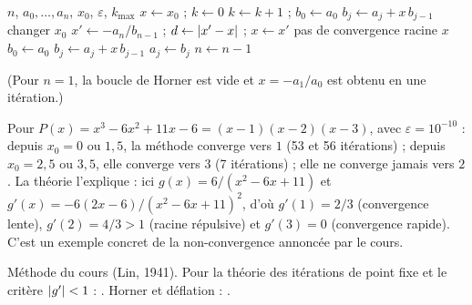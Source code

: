 \begin{algo}
  \Require $n$, $a_0, \dots, a_n$, $x_0$, $\varepsilon$, $k_{\max}$
    \State $x \leftarrow x_0$ ; $k \leftarrow 0$
    \Repeat
      \State $k \leftarrow k+1$ ; $b_0 \leftarrow a_0$
       \State $b_j \leftarrow a_j + x\,b_{j-1}$ \EndFor
       \Print \og changer $x_0$ \fg{} \Stop \EndIf
      \State $x' \leftarrow -a_n/b_{n-1}$ ; $d \leftarrow \left|x' - x\right|$ ; $x \leftarrow x'$
     \Print \og pas de convergence \fg{} \Stop \EndIf
    \Print racine $x$
    \State $b_0 \leftarrow a_0$
     \State $b_j \leftarrow a_j + x\,b_{j-1}$ \EndFor
     \State $a_j \leftarrow b_j$ \EndFor
    \State $n \leftarrow n-1$
  \EndWhile
\end{algo}
(Pour $n = 1$, la boucle de Horner est vide et $x = -a_1/a_0$ est obtenu en une
itération.)

\Verif Pour $P(x) = x^3 - 6x^2 + 11x - 6 = (x-1)(x-2)(x-3)$, avec
$\varepsilon = 10^{-10}$ : depuis $x_0 = 0$ ou $1{,}5$, la méthode converge vers
$1$ (53 et 56 itérations) ; depuis $x_0 = 2{,}5$ ou $3{,}5$, elle converge vers
$3$ (7 itérations) ; elle ne converge jamais vers $2$. La théorie l'explique :
ici $g(x) = 6/(x^2 - 6x + 11)$ et $g'(x) = -6(2x-6)/(x^2-6x+11)^2$, d'où
$g'(1) = 2/3$ (convergence lente), $g'(2) = 4/3 > 1$ (racine répulsive) et
$g'(3) = 0$ (convergence rapide). C'est un exemple concret de la non-convergence
annoncée par le cours.

\Refs Méthode du cours (Lin, 1941). Pour la théorie des itérations de point
fixe et le critère $\left|g'\right| < 1$ : . Horner
et déflation : .
